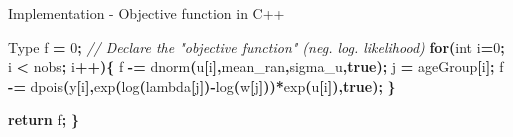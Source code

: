 \documentclass[aspectratio=169]{beamer}
\newenvironment{Shaded}{\begin{snugshade}}{\end{snugshade}}
\newcommand{\CommentTok}[1]{\textcolor[rgb]{0.56,0.35,0.01}{\textit{#1}}}
\newcommand{\ControlFlowTok}[1]{\textcolor[rgb]{0.13,0.29,0.53}{\textbf{#1}}}
\newcommand{\DataTypeTok}[1]{\textcolor[rgb]{0.13,0.29,0.53}{#1}}
\newcommand{\DecValTok}[1]{\textcolor[rgb]{0.00,0.00,0.81}{#1}}
\newcommand{\KeywordTok}[1]{\textcolor[rgb]{0.13,0.29,0.53}{\textbf{#1}}}
\newcommand{\NormalTok}[1]{#1}
\newcommand{\OperatorTok}[1]{\textcolor[rgb]{0.81,0.36,0.00}{\textbf{#1}}}
\begin{document}
\begin{frame}[fragile]{Implementation - Objective function in C++}
\begin{Shaded}
\begin{Highlighting}[]
\NormalTok{  Type f }\OperatorTok{=} \DecValTok{0}\OperatorTok{;}               \CommentTok{// Declare the "objective function" (neg. log. likelihood)}
  \ControlFlowTok{for}\OperatorTok{(}\DataTypeTok{int}\NormalTok{ i}\OperatorTok{=}\DecValTok{0}\OperatorTok{;}\NormalTok{ i }\OperatorTok{\textless{}}\NormalTok{ nobs}\OperatorTok{;}\NormalTok{ i}\OperatorTok{++)\{}
\NormalTok{    f }\OperatorTok{{-}=}\NormalTok{ dnorm}\OperatorTok{(}\NormalTok{u}\OperatorTok{[}\NormalTok{i}\OperatorTok{],}\NormalTok{mean\_ran}\OperatorTok{,}\NormalTok{sigma\_u}\OperatorTok{,}\KeywordTok{true}\OperatorTok{);}
\NormalTok{    j }\OperatorTok{=}\NormalTok{ ageGroup}\OperatorTok{[}\NormalTok{i}\OperatorTok{];}
\NormalTok{    f }\OperatorTok{{-}=}\NormalTok{ dpois}\OperatorTok{(}\NormalTok{y}\OperatorTok{[}\NormalTok{i}\OperatorTok{],}\NormalTok{exp}\OperatorTok{(}\NormalTok{log}\OperatorTok{(}\NormalTok{lambda}\OperatorTok{[}\NormalTok{j}\OperatorTok{]){-}}\NormalTok{log}\OperatorTok{(}\NormalTok{w}\OperatorTok{[}\NormalTok{j}\OperatorTok{]))*}\NormalTok{exp}\OperatorTok{(}\NormalTok{u}\OperatorTok{[}\NormalTok{i}\OperatorTok{]),}\KeywordTok{true}\OperatorTok{);}
  \OperatorTok{\}}
  
  \ControlFlowTok{return}\NormalTok{ f}\OperatorTok{;}
\OperatorTok{\}}
\end{Highlighting}
\end{Shaded}

\normalsize
\end{frame}
\end{document}
